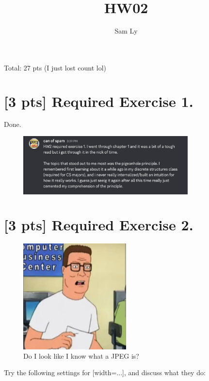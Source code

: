 \documentclass{article}
\title{HW02}
\author{Sam Ly}
\begin{document}
\maketitle

Total: 27 pts (I just lost count lol)

\section*{[3 pts] Required Exercise 1.}

Done.

\begin{figure}[htbp]
    \centering
    \includegraphics[width=0.8\textwidth]{figures/prompt.png}
\end{figure}

\section*{[3 pts] Required Exercise 2.}

\begin{figure}[h]
    \centering
    \includegraphics[width=0.5\textwidth]{figures/hank.jpeg}
    \caption{Do I look like I know what a JPEG is?}
\end{figure}

Try the following settings for [width=...], and discuss what they do: 
\end{document}
